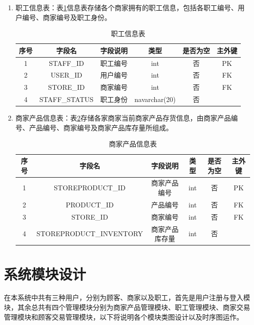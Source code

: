 \begin{enumerate}
		\item 职工信息表：表\ref{staff}信息表存储各个商家拥有的职工信息，包括各职工编号、用户编号、商家编号及职工身份。
				\begin{table}[!htbp]
				\centering
				\caption{职工信息表}
				\label{staff}
				\begin{tabular}{|c|c|c|c|c|c|}
				\hline
				序号 & 字段名 & 字段说明 & 类型 & 是否为空 & 主外键 \\ \hline
				1 & STAFF\_ID & 职工编号 & int & 否 & PK \\ \hline
				2 & USER\_ID & 用户编号 & int & 否 & FK \\ \hline
				3 & STORE\_ID & 商家编号 & int & 否 & FK \\ \hline
				4 & STAFF\_STATUS & 职工身份 & navarchar(20) & 否 &  \\ \hline
				\end{tabular}
				\end{table}

		\item 商家产品信息表：表\ref{storeproduct}存储各家商家当前商家产品存货信息，由商家产品编号、产品编号、商家编号及商家产品库存量所组成。
				\begin{table}[!htbp]
				\centering
				\caption{商家产品信息表}
				\label{storeproduct}
				\begin{tabular}{|c|c|c|c|c|c|}
				\hline
				序号 & 字段名 & 字段说明 & 类型 & 是否为空 & 主外键 \\ \hline
				1 & STOREPRODUCT\_ID & 商家产品编号 & int & 否 & PK \\ \hline
				2 & PRODUCT\_ID & 产品编号 & int & 否 & FK \\ \hline
				3 & STORE\_ID & 商家编号 & int & 否 & FK \\ \hline
				4 & STOREPRODUCT\_INVENTORY & 商家产品库存量 & int & 否 &  \\ \hline
				\end{tabular}
				\end{table}

	\end{enumerate}

\section{系统模块设计}
在本系统中共有三种用户，分别为顾客、商家以及职工，首先是用户注册与登入模块，其余总共有四个管理模块分别为商家产品管理模块、职工管理模块、商家交易管理模块和顾客交易管理模块，以下将说明各个模块类图设计以及时序图运作。

